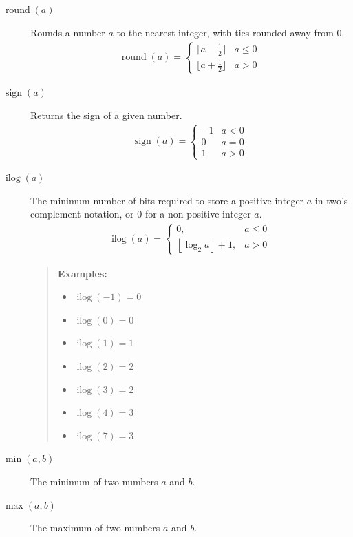 \documentclass[9pt,letterpaper]{book}
\newcommand{\ilog}{\ensuremath{\mathop{\mathrm{ilog}}\nolimits}}
\newcommand{\round}{\ensuremath{\mathop{\mathrm{round}}\nolimits}}
\newcommand{\sign}{\ensuremath{\mathop{\mathrm{sign}}\nolimits}}
\numberwithin{equation}{chapter}
\numberwithin{figure}{chapter}
\numberwithin{table}{chapter}
\begin{document}
\begin{description}
\item[$\round(a)$]
Rounds a number $a$ to the nearest integer, with ties rounded away from $0$.
\begin{align*}
\round(a) = \left\{\begin{array}{ll}
\lceil a-\frac{1}{2}\rceil   & a \le 0 \\
\lfloor a+\frac{1}{2}\rfloor & a > 0
\end{array}\right.
\end{align*}

\item[$\sign(a)$]
Returns the sign of a given number.
\begin{align*}
\sign(a) = \left\{\begin{array}{ll}
-1 & a < 0 \\
0  & a = 0 \\
1  & a > 0
\end{array}\right.
\end{align*}

\item[$\ilog(a)$]
The minimum number of bits required to store a positive integer $a$ in
 two's complement notation, or $0$ for a non-positive integer $a$.
\begin{align*}
\ilog(a) = \left\{\begin{array}{ll}
0, & a \le 0 \\
\left\lfloor\log_2{a}\right\rfloor+1, & a > 0
\end{array}\right.
\end{align*}

\begin{verse}
{\bf Examples:}
\begin{itemize}
\item $\ilog(-1)=0$
\item $\ilog(0)=0$
\item $\ilog(1)=1$
\item $\ilog(2)=2$
\item $\ilog(3)=2$
\item $\ilog(4)=3$
\item $\ilog(7)=3$
\end{itemize}
\end{verse}

\item[$\min(a,b)$]
The minimum of two numbers $a$ and $b$.

\item[$\max(a,b)$]
The maximum of two numbers $a$ and $b$.

\end{description}
\cleardoublepage
\end{document}

